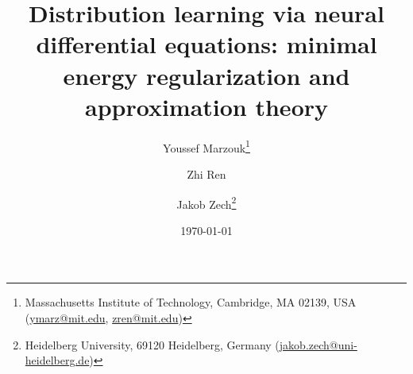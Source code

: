 \documentclass[11pt]{article}
\begin{document}
\title{Distribution learning via neural differential equations: minimal energy regularization and approximation theory}

\author{Youssef Marzouk\thanks{Massachusetts Institute of Technology, Cambridge, MA 02139, USA (\href{mailto:ymarz@mit.edu}{ymarz@mit.edu}, \href{mailto:zren@mit.edu}{zren@mit.edu})} \and Zhi Ren\footnotemark[1]
\and Jakob Zech\thanks{Heidelberg University, 69120 Heidelberg, Germany (\href{mailto:jakob.zech@uni-heidelberg.de}{jakob.zech@uni-heidelberg.de})} 
}

\date{\today}

\maketitle
	
\end{document}
